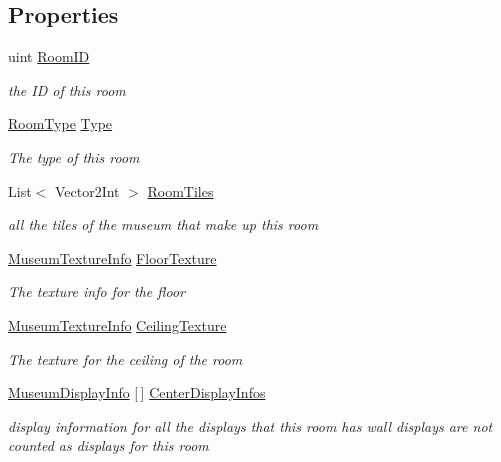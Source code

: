 \subsection*{Properties}
\begin{DoxyCompactItemize}
\item 
uint \mbox{\hyperlink{class_room_a499df97242b8996b66cc22737159f59c}{Room\+ID}}
\begin{DoxyCompactList}\small\item\em the ID of this room \end{DoxyCompactList}\item 
\mbox{\hyperlink{_room_8cs_ab540f7414f306325d92272bcef1e34e1}{Room\+Type}} \mbox{\hyperlink{class_room_a55dc5c580ea31562a0aa6f11b4b8f462}{Type}}
\begin{DoxyCompactList}\small\item\em The type of this room \end{DoxyCompactList}\item 
List$<$ Vector2\+Int $>$ \mbox{\hyperlink{class_room_aed67349f7f161cb2214111eff3e51018}{Room\+Tiles}}
\begin{DoxyCompactList}\small\item\em all the tiles of the museum that make up this room \end{DoxyCompactList}\item 
\mbox{\hyperlink{class_museum_texture_info}{Museum\+Texture\+Info}} \mbox{\hyperlink{class_room_a53b139a4a9f372914e9c574b42f0a8b2}{Floor\+Texture}}
\begin{DoxyCompactList}\small\item\em The texture info for the floor \end{DoxyCompactList}\item 
\mbox{\hyperlink{class_museum_texture_info}{Museum\+Texture\+Info}} \mbox{\hyperlink{class_room_a415866d8fd49a481729fa9782f348d8d}{Ceiling\+Texture}}
\begin{DoxyCompactList}\small\item\em The texture for the ceiling of the room \end{DoxyCompactList}\item 
\mbox{\hyperlink{class_museum_display_info}{Museum\+Display\+Info}} \mbox{[}$\,$\mbox{]} \mbox{\hyperlink{class_room_ab7a1da4fa70bf843d643391bdbaa1fb5}{Center\+Display\+Infos}}
\begin{DoxyCompactList}\small\item\em display information for all the displays that this room has wall displays are not counted as displays for this room \end{DoxyCompactList}\end{DoxyCompactItemize}
